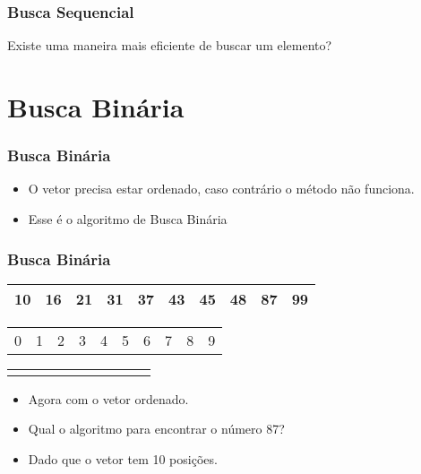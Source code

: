 \documentclass{beamer}
\begin{document}
\begin{frame}
	\frametitle{Busca Sequencial}
    \centering
    
\end{frame}

\begin{frame}
    \begin{center}
        \Large Existe uma maneira mais eficiente de buscar um elemento?
	\end{center}
\end{frame}

\section{Busca Binária}

\begin{frame}
    \frametitle{Busca Binária}
    \begin{itemize}
        \item O vetor precisa estar ordenado, caso contrário o método não funciona.
        \item Esse é o algoritmo de Busca Binária
    \end{itemize}
\end{frame}

\begin{frame}
    \frametitle{Busca Binária}
    \begin{center}
        \begin{table}
            \begin{tabular}{| p{0.25cm} | p{0.25cm} | p{0.25cm} | p{0.25cm} | p{0.25cm} | p{0.25cm} | p{0.25cm} | p{0.25cm} | p{0.25cm} | p{0.25cm} |}
                \hline
                10 & 16 & 21 & 31 & 37 & 43 & 45 & 48 & 87 & 99 \\ \hline
            \end{tabular}
            \begin{tabular}{p{0.25cm} p{0.25cm} p{0.25cm} p{0.25cm} p{0.25cm} p{0.25cm} p{0.25cm} p{0.25cm} p{0.25cm} p{0.25cm}}
                0 & 1 & 2 & 3 & 4 & 5 & 6 & 7 & 8 & 9
            \end{tabular}
            \begin{tabular}{p{0.25cm} p{0.25cm} p{0.25cm} p{0.25cm} p{0.25cm} p{0.25cm} p{0.25cm} p{0.25cm} p{0.25cm} p{0.25cm}}
                & & & & & & & & &
            \end{tabular}
        \end{table}
	\end{center}
    \begin{itemize}[<+->]
        \item Agora com o vetor ordenado.
        \item Qual o algoritmo para encontrar o número 87?
        \item Dado que o vetor tem 10 posições.
    \end{itemize}
\end{frame}
\end{document}
